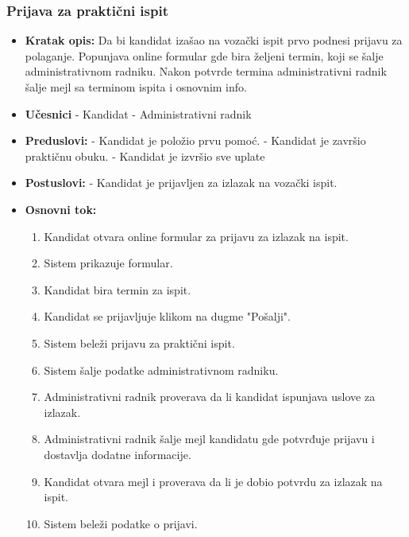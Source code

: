 \subsubsection{Prijava za praktični ispit}

\vspace{3mm}

\begin{itemize}

\item \textbf{Kratak opis:} Da bi kandidat izašao na vozački ispit prvo podnesi prijavu za polaganje. Popunjava online formular gde bira željeni termin, koji se  šalje administrativnom radniku. Nakon potvrde termina administrativni radnik šalje mejl sa terminom ispita i osnovnim info.

\vspace{2mm}

\item \textbf{Učesnici} \newline
   - Kandidat \newline   
   - Administrativni radnik 
   
\item \textbf{Preduslovi:} \newline
   - Kandidat je položio prvu pomoć. \newline
   - Kandidat je završio praktičnu obuku. \newline
   - Kandidat je izvršio sve uplate

\item \textbf{Postuslovi:} \newline
    - Kandidat je prijavljen za izlazak na vozački ispit.

\item \textbf{Osnovni tok:}  
   \begin{enumerate}
   \item Kandidat otvara online formular za prijavu za izlazak na ispit.
   \item Sistem prikazuje formular.
   \item Kandidat bira termin za ispit.
   \item Kandidat se prijavljuje klikom na dugme "Pošalji".
   \item Sistem beleži prijavu za praktični ispit.
   \item Sistem šalje podatke administrativnom radniku.
   \item Administrativni radnik proverava da li kandidat ispunjava uslove za izlazak.
   \item Administrativni radnik šalje mejl kandidatu gde potvrđuje prijavu i dostavlja dodatne informacije.
   \item Kandidat otvara mejl i proverava da li je dobio potvrdu za izlazak na ispit. 
   \item Sistem beleži podatke o prijavi. 
   \end{enumerate}


\end{itemize}
